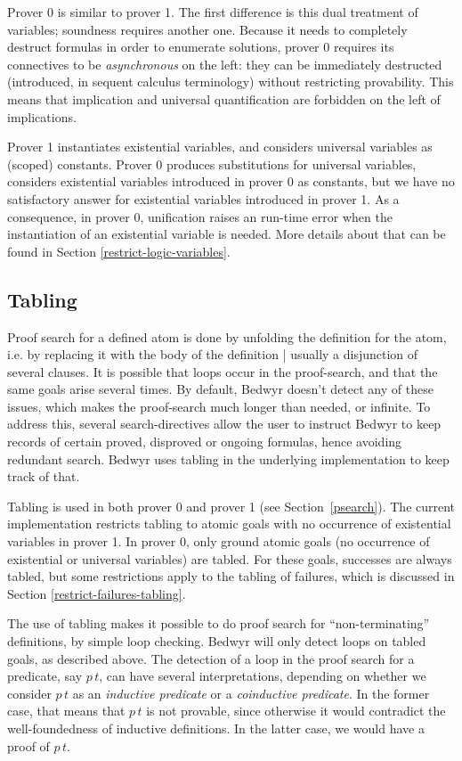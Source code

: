\documentclass{article}
\begin{document}
Prover 0 is similar to prover 1.
The first difference is this dual treatment of variables;
soundness requires another one.
Because it needs to completely destruct formulas in order to enumerate
solutions, prover 0 requires its connectives to be \emph{asynchronous} on the
left: they can be immediately destructed (introduced, in sequent
calculus terminology) without restricting provability.
This means that implication and universal quantification are forbidden on the
left of implications.

Prover 1 instantiates existential variables, and considers universal variables
as (scoped) constants. Prover 0 produces substitutions for universal variables,
considers existential variables introduced in prover 0 as constants,
but we have no satisfactory answer for existential variables introduced in
prover 1.
As a consequence, in prover 0, unification raises an run-time error
when the instantiation of an existential variable is needed.
More details about that can be found in Section \ref{restrict-logic-variables}.

\subsection{Tabling}
\label{tabling}

Proof search for a defined atom is done by unfolding the definition
for the atom, i.e. by replacing it with the body of the definition |
usually a disjunction of several clauses.
It is possible that loops occur in the proof-search,
and that the same goals arise several times.
By default, Bedwyr doesn't detect any of these issues, which makes the
proof-search much longer than needed, or infinite.
To address this, several search-directives
allow the user to instruct Bedwyr to keep records of certain
proved, disproved or ongoing formulas,
hence avoiding redundant search.
Bedwyr uses tabling in the underlying implementation to keep track of that.

Tabling is used in both prover 0 and prover 1 (see Section~\ref{psearch}).
The current implementation restricts tabling to atomic goals
with no occurrence of existential variables in prover 1.
In prover 0, only ground atomic goals (no occurrence of existential or universal
variables) are tabled.
For these goals, successes are always tabled, but some restrictions apply
to the tabling of failures, which is discussed in Section
\ref{restrict-failures-tabling}.

The use of tabling makes it possible to do proof search for
``non-terminating'' definitions, by simple loop checking.
Bedwyr will only detect loops on tabled goals, as described above.
The detection of a loop in the proof search for a predicate, say
$p\,t$, can have several interpretations, depending on whether
we consider $p\,t$ as an {\em inductive predicate} or
a {\em coinductive predicate}. In the former case, that means that
$p\,t$ is not provable, since otherwise it would contradict
the well-foundedness of inductive definitions. In the latter case,
we would have a proof of $p\,t$.
\end{document}
